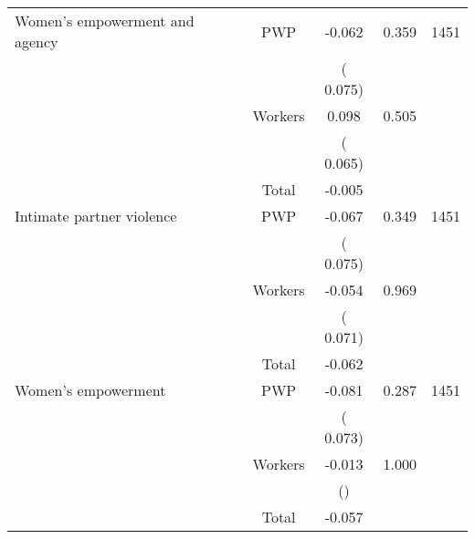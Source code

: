 \begin{tabular}{l*{4}{c}}
\cmidrule{2-3}
 Women's empowerment and agency                &       PWP     &             -0.062               &        0.359   & 1451                              \\ 
                               &                               &       (       0.075)                     & &                                                                             \\ 
                               &       Workers         &              0.098               &        0.505   &                                               \\ 
                               &                               &       (       0.065)                     & &                                                                             \\ 
\cmidrule{2-3}
                               &       Total           &             -0.005               &   &                                               \\ 
\cmidrule{2-3}
 Intimate partner violence                &       PWP     &             -0.067               &        0.349   & 1451                              \\ 
                               &                               &       (       0.075)                     & &                                                                             \\ 
                               &       Workers         &             -0.054               &        0.969   &                                               \\ 
                               &                               &       (       0.071)                     & &                                                                             \\ 
\cmidrule{2-3}
                               &       Total           &             -0.062               &   &                                               \\ 
\cmidrule{2-3}
 Women's empowerment                &       PWP     &             -0.081               &        0.287   & 1451                              \\ 
                               &                               &       (       0.073)                     & &                                                                             \\ 
                               &       Workers         &             -0.013               &        1.000   &                                               \\ 
                               &                               &       ()                     & &                                                                             \\ 
\cmidrule{2-3}
                               &       Total           &             -0.057               &   &                                               \\ 
\cmidrule{2-3}
\hline \end{tabular}                                                                                                              
